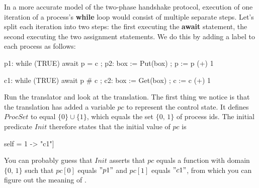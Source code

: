 \documentclass[fleqn,leqno]{article}
\begin{document}
In a more accurate model of the two-phase handshake protocol, execution
of one iteration of a process's \textbf{while} loop would consist of
multiple separate steps.  Let's split each iteration into two steps: the
first executing the \textbf{await} statement, the second executing the
two assignment statements.  We do this by adding a label to each process
as follows:
\begin{display}
\begin{twocols}[.35]
\begin{nopcal}
p1: while (TRUE)
      {     await p = c ;
        p2: box := Put(box) ;
            p := p (+) 1
      }
\end{nopcal}
\begin{tlatex}
%
%
%
%
\end{tlatex}
\midcol
\begin{nopcal}
c1: while (TRUE)
      {     await p # c ;
        c2: box := Get(box) ;
            c := c (+) 1
      }
\end{nopcal}
\begin{tlatex}
%
%
%
%
\end{tlatex}
\end{twocols}
\end{display}
Run the translator and look at the translation.  The first thing we notice
is that the translation has added a variable $pc$ to represent the control
state.  It defines $ProcSet$ to equal $\{0\} \cup \{1\}$, which equals
the set $\{0,\,1\}$ of process ids.  The initial predicate $Init$
therefore states that the initial value of $pc$ is%
\begin{display}
\begin{notla}
[self \in {0, 1} |-> CASE self = 0 -> "p1"
                       [] self = 1 -> "c1"]
\end{notla}
\begin{tlatex}
 \@x{ [ self \.{\in} \{ 0 ,\, 1 \} \.{\mapsto} {\CASE} self \.{=} 0
 \.{\rightarrow}\@w{p1}}%
\@x{\@s{88.40} {\Box}\@s{4.30} self \.{=} 1 \.{\rightarrow}\@w{c1} ]}%
\end{tlatex}
\end{display}
You can probably guess that $Init$ asserts that $pc$ equals a function
with domain $\{0,\,1\}$ such that $pc[0]$ equals $"p1"$ and $pc[1]$
equals $"c1"$, from which you can figure out the meaning of
.
\end{document}
